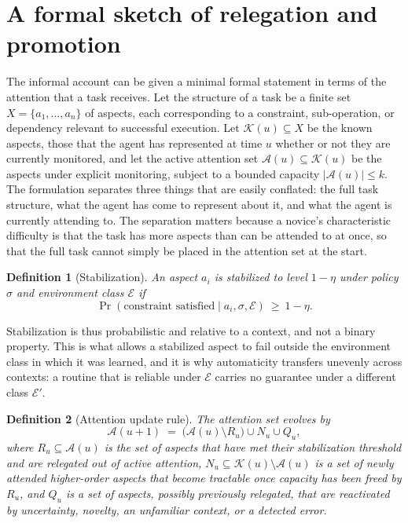 \documentclass[11pt]{report}
\newtheorem{definition}{Definition}[chapter]
\theoremstyle{remark}
\theoremstyle{definition}
\begin{document}
\section{A formal sketch of relegation and promotion}

The informal account can be given a minimal formal statement in terms of the attention that a task receives. Let the structure of a task be a finite set $X=\{a_1,\dots,a_n\}$ of aspects, each corresponding to a constraint, sub-operation, or dependency relevant to successful execution. Let $\mathcal{K}(u)\subseteq X$ be the known aspects, those that the agent has represented at time $u$ whether or not they are currently monitored, and let the active attention set $\mathcal{A}(u)\subseteq\mathcal{K}(u)$ be the aspects under explicit monitoring, subject to a bounded capacity $|\mathcal{A}(u)|\le k$. The formulation separates three things that are easily conflated: the full task structure, what the agent has come to represent about it, and what the agent is currently attending to. The separation matters because a novice's characteristic difficulty is that the task has more aspects than can be attended to at once, so that the full task cannot simply be placed in the attention set at the start.

\begin{definition}[Stabilization]
An aspect $a_i$ is \emph{stabilized to level $1-\eta$ under policy $\sigma$ and environment class $\mathcal{E}$} if
\[
\Pr(\text{constraint satisfied}\mid a_i,\sigma,\mathcal{E})\ \ge\ 1-\eta .
\]
\end{definition}

Stabilization is thus probabilistic and relative to a context, and not a binary property. This is what allows a stabilized aspect to fail outside the environment class in which it was learned, and it is why automaticity transfers unevenly across contexts: a routine that is reliable under $\mathcal{E}$ carries no guarantee under a different class $\mathcal{E}'$.

\begin{definition}[Attention update rule]
The attention set evolves by
\[
\mathcal{A}(u+1)\;=\;\bigl(\mathcal{A}(u)\setminus R_u\bigr)\cup N_u\cup Q_u ,
\]
where $R_u\subseteq\mathcal{A}(u)$ is the set of aspects that have met their stabilization threshold and are relegated out of active attention, $N_u\subseteq\mathcal{K}(u)\setminus\mathcal{A}(u)$ is a set of newly attended higher-order aspects that become tractable once capacity has been freed by $R_u$, and $Q_u$ is a set of aspects, possibly previously relegated, that are reactivated by uncertainty, novelty, an unfamiliar context, or a detected error.
\end{definition}
\end{document}
